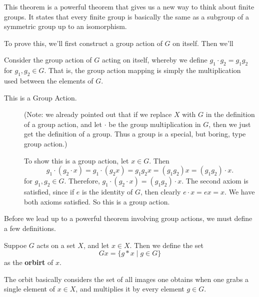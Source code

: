     This theorem is a powerful theorem that gives us a new way to
    think about finite groups. It states that every finite group is
    basically the same as a subgroup of a symmetric group up to an
    isomorphism. 

    \begin{prf}
        \textcolor{NavyBlue}{To prove this, we'll first construct a
        group action of $G$ on itself. Then we'll }

        Consider the group action of $G$ acting on itself, whereby we
        define $g_1 \cdot g_2 = g_1g_2$ for $g_1, g_2 \in G$. That is,
        the group action 
        mapping is simply the multiplication used between the elements
        of $G$. 
        \begin{description}
            \item[This is a Group Action.] 
            (Note: we already pointed out that if we replace $X$ with
            $G$ in the definition of a group action, and let $\cdot$
            be the group multiplication in $G$, then we just get the
            definition of a group. Thus a group is a special, but
            boring, type group action.)

            To show this is a group action, let $x \in G$. Then 
            \[
                g_1 \cdot (g_2 \cdot x) = g_1 \cdot (g_2x) = g_1g_2x = (g_1g_2)x = (g_1g_2) \cdot x.
            \]
            for $g_1, g_2 \in G$.
            Therefore, $g_1 \cdot (g_2 \cdot x) = (g_1g_2) \cdot x.$
            The second axiom is satisfied, since if $e$ is the
            identity of $G$, then clearly $e \cdot x = ex = x$. We
            have both axioms satisfied. So this is a group action. 
        \end{description}
    \end{prf}

    Before we lead up to a powerful theorem involving group actions,
    we must define a few definitions. 
    
    \begin{definition}
        Suppoe $G$ acts on a set $X$, and let $x \in X$. Then we
        define the set 
        \[
            Gx = \{g * x \mid g \in G \}
        \]
        as the \textbf{orbirt} of $x$. 
    \end{definition}

    The orbit basically considers the set of all images one obtains
    when one grabs a single element of $x \in X$, and multiplies it by
    every element $g \in G$. {\color{purple}{Note that since $g
    \cdot x \in X$ for every $g \in G, x \in X$, we have that $Gx \subset X$.}}
    
